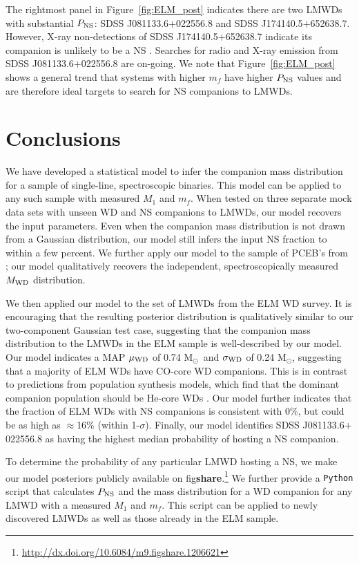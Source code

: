 \documentclass[apjl]{emulateapj}
\newcommand{\Msun}{\ifmmode {{\rm M}_{\odot}}\else M$_{\odot}$\fi}
\newcommand{\mf}{m_f}
\begin{document}
The rightmost panel in Figure~\ref{fig:ELM_post} indicates there are two LMWDs with substantial $P_{\rm NS}$: SDSS J081133.6$+$022556.8 and SDSS J174140.5$+$652638.7. However, X-ray non-detections of SDSS J174140.5$+$652638.7 indicate its companion is unlikely to be a NS \citep{kilic14}. Searches for radio and X-ray emission from SDSS J081133.6$+$022556.8 are on-going. We note that Figure~\ref{fig:ELM_post} shows a general trend that systems with higher $\mf$ have higher $P_{\rm NS}$ values and are therefore ideal targets to search for NS companions to LMWDs.

\section{Conclusions}
We have developed a statistical model to infer the companion mass distribution for a sample of single-line, spectroscopic binaries. This model can be applied to any such sample with measured $M_1$ and $\mf$. When tested on three separate mock data sets with unseen WD and NS companions to LMWDs, our model recovers the input parameters. Even when the companion mass distribution is not drawn from a Gaussian distribution, our model still infers the input NS fraction to within a few percent. We further apply our model to the sample of PCEB's from \citet{nebot11}; our model qualitatively recovers the independent, spectroscopically measured $M_{\rm WD}$ distribution. 


We then applied our model to the set of LMWDs from the ELM WD survey. It is encouraging that the resulting posterior distribution is qualitatively similar to our two-component Gaussian test case, suggesting that the companion mass distribution to the LMWDs in the ELM sample is well-described by our model. Our model indicates a MAP $\mu_{\rm WD}$ of 0.74 \Msun\ and $\sigma_{\rm WD}$ of 0.24 \Msun, suggesting that a majority of ELM WDs have CO-core WD companions. This is in contrast to predictions from population synthesis models, which find that the dominant companion population should be He-core WDs \citep[e.g.,][]{toonen12}. Our model further indicates that the fraction of ELM WDs with NS companions is consistent with 0\%, but could be as high as $\approx$16\% (within 1-$\sigma$). Finally, our model identifies SDSS J081133.6$+$022556.8 as having the highest median probability of hosting a NS companion.

To determine the probability of any particular LMWD hosting a NS, we make our model posteriors publicly available on fig{\bf share}.\footnote{\url{http://dx.doi.org/10.6084/m9.figshare.1206621}} We further provide a {\tt Python} script that calculates $P_{\rm NS}$ and the mass distribution for a WD companion for any LMWD with a measured $M_1$ and $\mf$. This script can be applied to newly discovered LMWDs as well as those already in the ELM sample.
\end{document}
